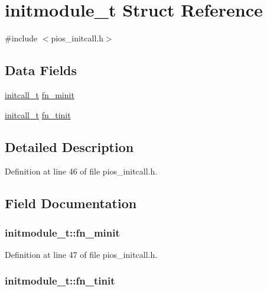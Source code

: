 \hypertarget{structinitmodule__t}{\section{initmodule\-\_\-t Struct Reference}
\label{structinitmodule__t}
}


{\ttfamily \#include $<$pios\-\_\-initcall.\-h$>$}

\subsection*{Data Fields}
\begin{DoxyCompactItemize}
\item 
\hyperlink{group___p_i_o_s___i_n_i_t_c_a_l_l_ga4f58a033b271ad632c4583977de7e3c0}{initcall\-\_\-t} \hyperlink{structinitmodule__t_ada4d22cb004c06a158b05703774113a0}{fn\-\_\-minit}
\item 
\hyperlink{group___p_i_o_s___i_n_i_t_c_a_l_l_ga4f58a033b271ad632c4583977de7e3c0}{initcall\-\_\-t} \hyperlink{structinitmodule__t_a75491302bbfa9a34608832bb9bbf83ff}{fn\-\_\-tinit}
\end{DoxyCompactItemize}


\subsection{Detailed Description}


Definition at line 46 of file pios\-\_\-initcall.\-h.



\subsection{Field Documentation}
\hypertarget{structinitmodule__t_ada4d22cb004c06a158b05703774113a0}{
\subsubsection[{fn\-\_\-minit}]{ initmodule\-\_\-t\-::fn\-\_\-minit}}\label{structinitmodule__t_ada4d22cb004c06a158b05703774113a0}


Definition at line 47 of file pios\-\_\-initcall.\-h.

\hypertarget{structinitmodule__t_a75491302bbfa9a34608832bb9bbf83ff}{
\subsubsection[{fn\-\_\-tinit}]{ initmodule\-\_\-t\-::fn\-\_\-tinit}}\label{structinitmodule__t_a75491302bbfa9a34608832bb9bbf83ff}


